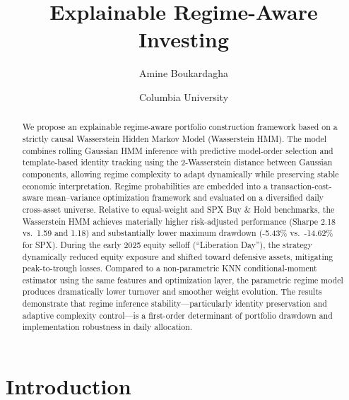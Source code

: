\documentclass[11pt]{article}
\title{
Explainable Regime-Aware Investing
}
\author{Amine Boukardagha}
\date{Columbia University}
\begin{document}
\maketitle

\begin{abstract}
We propose an explainable regime-aware portfolio construction framework based on a strictly causal Wasserstein Hidden Markov Model (Wasserstein HMM).
The model combines rolling Gaussian HMM inference with predictive model-order selection and template-based identity tracking using the 2-Wasserstein distance between Gaussian components, allowing regime complexity to adapt dynamically while preserving stable economic interpretation. Regime probabilities are embedded into a transaction-cost-aware mean--variance optimization framework and evaluated on a diversified daily cross-asset universe.  Relative to equal-weight and SPX Buy \& Hold benchmarks, the Wasserstein HMM achieves materially higher risk-adjusted performance (Sharpe 2.18 vs.\ 1.59 and 1.18) and substantially lower maximum drawdown (-5.43\% vs.\ -14.62\% for SPX). 
During the early 2025 equity selloff (``Liberation Day''), the strategy dynamically reduced equity exposure and shifted toward defensive assets, mitigating peak-to-trough losses. Compared to a non-parametric KNN conditional-moment estimator using the same features and optimization layer, the parametric regime model produces dramatically lower turnover and smoother weight evolution. 
The results demonstrate that regime inference stability—particularly identity preservation and adaptive complexity control—is a first-order determinant of portfolio drawdown and implementation robustness in daily allocation.
\end{abstract}

\section{Introduction}
\end{document}
